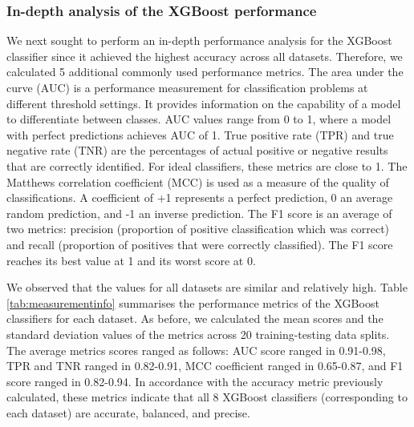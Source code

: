 \documentclass{bmcart}
\begin{document}
\subsubsection*{In-depth analysis of the XGBoost performance}
We next sought to perform an in-depth performance analysis for the XGBoost classifier since it achieved the highest accuracy across all datasets. Therefore, we calculated 5 additional commonly used performance metrics. 
The area under the curve (AUC) is a performance measurement for classification problems at different threshold settings. It provides information on the capability of a model to differentiate between classes. AUC values range from 0 to 1, where a model with perfect predictions achieves AUC of 1. 
True positive rate (TPR) and true negative rate (TNR) are the percentages of actual positive or negative results that are correctly identified.  For ideal classifiers, these metrics are close to 1. The Matthews correlation coefficient (MCC) is used as a measure of the quality of classifications. A coefficient of +1 represents a perfect prediction, 0 an average random prediction, and -1 an inverse prediction. 
The F1 score is an average of two metrics: precision (proportion of positive classification which was correct) and recall (proportion of positives that were correctly classified). The F1 score reaches its best value at 1 and its worst score at 0. 

We observed that the values for all datasets are similar and relatively high. Table \ref{tab:measurementinfo} summarises the performance metrics of the XGBoost classifiers for each dataset. As before, we calculated the mean scores and the standard deviation values of the metrics across 20 training-testing data splits. The average metrics scores ranged as follows: AUC score ranged in 0.91-0.98, TPR and TNR ranged in 0.82-0.91, MCC coefficient ranged in 0.65-0.87, and F1 score ranged in 0.82-0.94. In accordance with the accuracy metric previously calculated, these metrics indicate that all 8 XGBoost classifiers (corresponding to each dataset) are accurate, balanced, and precise. 
\end{document}
